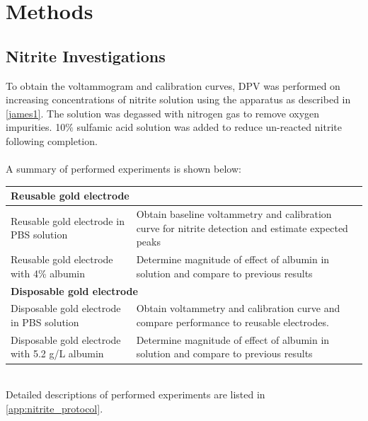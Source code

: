 \section{Methods}
\vspace{-0.5cm}
\subsection{Nitrite Investigations}
\vspace{-0.5cm}
To obtain the voltammogram and calibration curves, DPV was performed on increasing concentrations of nitrite solution using the apparatus as described in \autoref{james1}. The solution was degassed with nitrogen gas to remove oxygen impurities. 10$\%$ sulfamic acid solution was added to reduce un-reacted nitrite following completion.\\\\
A summary of performed experiments is shown below:

\begin{table}[H]
    \centering
    \begin{tabular}{ |p{3.7cm}||p{3.7cm}| } 
        \hline
        \multicolumn{2}{|l|}{\textbf{Reusable gold electrode}} \\ \hline
        Reusable gold electrode in PBS solution & Obtain baseline voltammetry and calibration curve for nitrite detection and estimate expected peaks\\ \hline
        Reusable gold electrode with 4\% albumin & Determine magnitude of effect of albumin in solution and compare to previous results \\ \hline
        \multicolumn{2}{|l|}{\textbf{Disposable gold electrode}} \\ \hline
    Disposable gold electrode in PBS solution & Obtain voltammetry and calibration curve and compare performance to reusable electrodes. \\ \hline
    Disposable gold electrode with 5.2 g/L albumin & Determine magnitude of effect of albumin in solution and compare to previous results\\ \hline
    \end{tabular}
    \label{tab:my_label}
\end{table}
 \\
Detailed descriptions of performed experiments are listed in \autoref{app:nitrite_protocol}.


